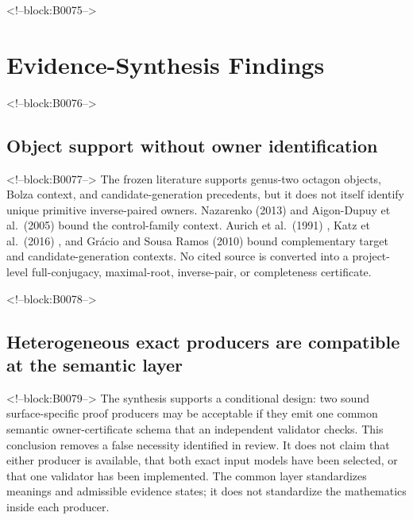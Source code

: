 \documentclass[11pt,a4paper]{article}
\begin{document}
<!--block:B0075-->
\hypertarget{evidence-synthesis-findings}{%
\section{Evidence-Synthesis Findings}\label{evidence-synthesis-findings}}

<!--block:B0076-->
\hypertarget{object-support-without-owner-identification}{%
\subsection{Object support without owner identification}\label{object-support-without-owner-identification}}

<!--block:B0077-->
The frozen literature supports genus-two octagon objects, Bolza context, and candidate-generation precedents, but it does not itself identify unique primitive inverse-paired owners. Nazarenko (2013)
\citep{P33-S01}
 and Aigon-Dupuy et al.~(2005)
\citep{P33-S02}
 bound the control-family context. Aurich et al.~(1991)
\citep{P33-S05}
, Katz et al.~(2016)
\citep{P33-S08}
, and Grácio and Sousa Ramos (2010)
\citep{P33-S09}
 bound complementary target and candidate-generation contexts. No cited source is converted into a project-level full-conjugacy, maximal-root, inverse-pair, or completeness certificate.

<!--block:B0078-->
\hypertarget{heterogeneous-exact-producers-are-compatible-at-the-semantic-layer}{%
\subsection{Heterogeneous exact producers are compatible at the semantic layer}\label{heterogeneous-exact-producers-are-compatible-at-the-semantic-layer}}

<!--block:B0079-->
The synthesis supports a conditional design: two sound surface-specific proof producers may be acceptable if they emit one common semantic owner-certificate schema that an independent validator checks. This conclusion removes a false necessity identified in review. It does not claim that either producer is available, that both exact input models have been selected, or that one validator has been implemented. The common layer standardizes meanings and admissible evidence states; it does not standardize the mathematics inside each producer.
\end{document}
